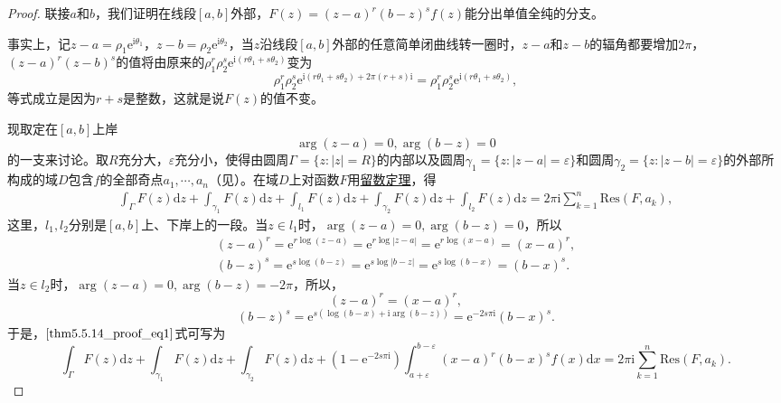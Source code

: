 \documentclass[../../main.tex]{subfiles}
\begin{document}
\begin{proof}
联接\( a \)和\( b \)，我们证明在线段\([a, b]\)外部，\( F(z) = (z - a)^r (b - z)^s f(z) \)能分出单值全纯的分支。

事实上，记\( z - a = \rho_1 \mathrm{e}^{\mathrm{i}\theta_1} \)，\( z - b = \rho_2 \mathrm{e}^{\mathrm{i}\theta_2} \)，当\( z \)沿线段\([a, b]\)外部的任意简单闭曲线转一圈时，\( z - a \)和\( z - b \)的辐角都要增加\( 2\pi \)，\( (z - a)^r (z - b)^s \)的值将由原来的\( \rho_1^r \rho_2^s \mathrm{e}^{\mathrm{i}(r\theta_1 + s\theta_2)} \)变为
\[
\rho_1^r \rho_2^s \mathrm{e}^{\mathrm{i}(r\theta_1 + s\theta_2) + 2\pi(r + s)\mathrm{i}} = \rho_1^r \rho_2^s \mathrm{e}^{\mathrm{i}(r\theta_1 + s\theta_2)},
\]
等式成立是因为\( r + s \)是整数，这就是说\( F(z) \)的值不变。

现取定在\([a, b]\)上岸
\[
\arg(z - a) = 0, \arg(b - z) = 0
\]
的一支来讨论。取\( R \)充分大，\( \varepsilon \)充分小，使得由圆周\( \Gamma = \{ z : |z| = R \} \)的内部以及圆周\( \gamma_1 = \{ z : |z - a| = \varepsilon \} \)和圆周\( \gamma_2 = \{ z : |z - b| = \varepsilon \} \)的外部所构成的域\( D \)包含\( f \)的全部奇点\( a_1, \cdots, a_n \)（见）。在域\( D \)上对函数\( F \)用\hyperref[theorem:留数定理(残数定理)-定理5.4.9]{留数定理}，得
\begin{align}
\int_{\Gamma} F(z) \mathrm{d}z + \int_{\gamma_1} F(z) \mathrm{d}z + \int_{l_1} F(z) \mathrm{d}z + \int_{\gamma_2} F(z) \mathrm{d}z + \int_{l_2} F(z) \mathrm{d}z
= 2\pi \mathrm{i} \sum_{k = 1}^{n} \mathrm{Res}(F, a_k), \label{thm5.5.14_proof_eq1}
\end{align}
这里，\( l_1, l_2 \)分别是\([a, b]\)上、下岸上的一段。当\( z \in l_1 \)时，\(\arg(z - a) = 0, \arg(b - z) = 0\)，所以
\begin{gather*}
(z - a)^r = \mathrm{e}^{r \log(z - a)} = \mathrm{e}^{r \log|z - a|}
= \mathrm{e}^{r \log(x - a)} = (x - a)^r,
\\
(b - z)^s = \mathrm{e}^{s \log(b - z)} = \mathrm{e}^{s \log|b - z|}
= \mathrm{e}^{s \log(b - x)} = (b - x)^s.
\end{gather*}
当\( z \in l_2 \)时，\(\arg(z - a) = 0, \arg(b - z) = -2\pi\)，所以，
\[
(z - a)^r = (x - a)^r,
\]
\[
(b - z)^s = \mathrm{e}^{s(\log(b - x) + \mathrm{i} \arg(b - z))}
= \mathrm{e}^{-2s\pi \mathrm{i}} (b - x)^s.
\]
于是，\(\eqref{thm5.5.14_proof_eq1}\)式可写为
\[
\int_{\Gamma} F(z) \mathrm{d}z + \int_{\gamma_1} F(z) \mathrm{d}z + \int_{\gamma_2} F(z) \mathrm{d}z
+ (1 - \mathrm{e}^{-2s\pi \mathrm{i}}) \int_{a + \varepsilon}^{b - \varepsilon} (x - a)^r (b - x)^s f(x) \mathrm{d}x
= 2\pi \mathrm{i} \sum_{k = 1}^{n} \mathrm{Res}(F, a_k). \label{thm5.5.14_proof_eq2}
\]
\end{proof}
\end{document}
